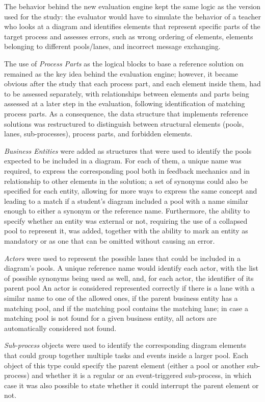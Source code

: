 The behavior behind the new evaluation engine kept the same logic as the version used for the study: the evaluator would have to simulate the behavior of a teacher who looks at a diagram and identifies elements that represent specific parts of the target process and assesses errors, such as wrong ordering of elements, elements belonging to different pools/lanes, and incorrect message exchanging.

The use of \textit{Process Parts} as the logical blocks to base a reference solution on remained as the key idea behind the evaluation engine; however, it became obvious after the study that each process part, and each element inside them, had to be assessed separately, with relationships between elements and parts being assessed at a later step in the evaluation, following identification of matching process parts. As a consequence, the data structure that implements reference solutions was restructured to distinguish between structural elements (pools, lanes, sub-processes), process parts, and forbidden elements.

\textit{Business Entities} were added as structures that were used to identify the pools expected to be included in a diagram. For each of them, a unique name was required, to express the corresponding pool both in feedback mechanics and in relationship to other elements in the solution; a set of synonyms could also be specified for each entity, allowing for more ways to express the same concept and leading to a match if a student's diagram included a pool with a name similar enough to either a synonym or the reference name. Furthermore, the ability to specify whether an entity was external or not, requiring the use of a collapsed pool to represent it, was added, together with the ability to mark an entity as mandatory or as one that can be omitted without causing an error.

\textit{Actors} were used to represent the possible lanes that could be included in a diagram's pools. A unique reference name would identify each actor, with the list of possible synonyms being used as well, and, for each actor, the identifier of its parent pool An actor is considered represented correctly if there is a lane with a similar name to one of the allowed ones, if the parent business entity has a matching pool, and if the matching pool contains the matching lane; in case a matching pool is not found for a given business entity, all actors are automatically considered not found.

\textit{Sub-process} objects were used to identify the corresponding diagram elements that could group together multiple tasks and events inside a larger pool. Each object of this type could specify the parent element (either a pool or another sub-process) and whether it is a regular or an event-triggered sub-process, in which case it was also possible to state whether it could interrupt the parent element or not.

